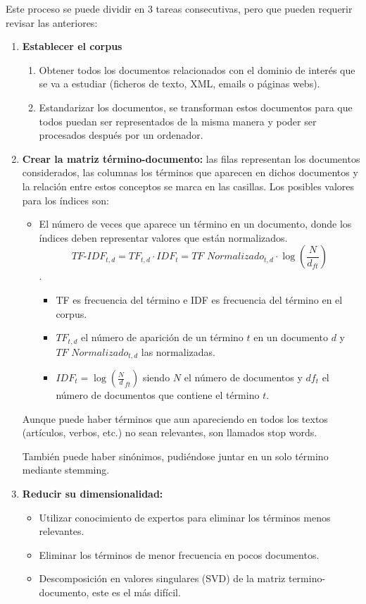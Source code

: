 \documentclass[12pt, twoside, openright]{report} %
\begin{document}
Este proceso se puede dividir en 3 tareas consecutivas, pero que pueden requerir revisar las anteriores:
\begin{enumerate}
	\item \textbf{Establecer el corpus}
	\begin{enumerate}
		\item Obtener todos los documentos relacionados con el dominio de interés que se va a estudiar (ficheros de texto, XML, emails o páginas webs).
		\item Estandarizar los documentos, se transforman estos documentos para que todos puedan ser representados de la misma manera y poder ser procesados después por un ordenador.
	\end{enumerate}
	\item \textbf{Crear la matriz término-documento:} las filas representan los documentos considerados, las columnas los términos que aparecen en dichos documentos y la relación entre estos conceptos se marca en las casillas. Los posibles valores para los índices son:
	\begin{itemize}
		\item El número de veces que aparece un término en un documento, donde los índices deben representar valores que están normalizados. $$\textit{TF-IDF}_{t,d} = TF_{t,d}\cdot IDF_t= \textit{TF Normalizado}_{t,d} \cdot \log \left(\frac {N} {d_{ft}} \right) $$. 
		\begin{itemize}
			\item TF es frecuencia del término e IDF es frecuencia del término en el corpus.
			\item $TF_{t,d}$ el número de aparición de un término $t$ en un documento $d$ y \\ $\textit{TF Normalizado}_{t,d}$ las normalizadas.
			\item $IDF_t = \log \left(\frac N d_{ft} \right)$ siendo $N$ el número de documentos y $df_t$ el número de documentos que contiene el término $t$.
		\end{itemize}
	\end{itemize}

	Aunque puede haber términos que aun apareciendo en todos los textos (artículos, verbos, etc.) no sean relevantes, son llamados stop words. 
	
	También puede haber sinónimos, pudiéndose juntar en un solo término mediante stemming.
	
	\item \textbf{Reducir su dimensionalidad:}
	\begin{itemize}
		\item Utilizar conocimiento de expertos para eliminar los términos menos relevantes.
		\item Eliminar los términos de menor frecuencia en pocos documentos.
		\item Descomposición en valores singulares (SVD) de la matriz termino-documento, este es el más difícil.
	\end{itemize}
	

\end{enumerate}
\end{document}
